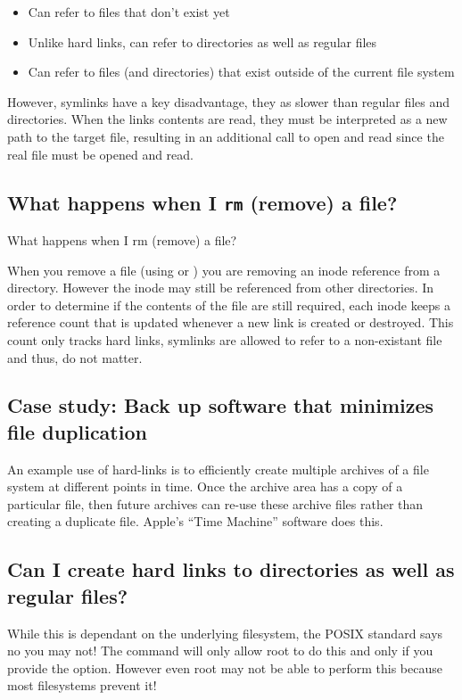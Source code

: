 \begin{itemize}
\tightlist
\item
  Can refer to files that don't exist yet
\item
  Unlike hard links, can refer to directories as well as regular files
\item
  Can refer to files (and directories) that exist outside of the current file system
\end{itemize}

However, symlinks have a key disadvantage, they as slower than regular files and directories. When the links contents are read, they must be interpreted as a new path to the target file, resulting in an additional call to open and read since the real file must be opened and read.

\subsection{What happens when I \texttt{rm} (remove) a file?}{What happens when I rm (remove) a file?}

When you remove a file (using  or ) you are removing an inode reference from a directory. However the inode may still be referenced from other directories. In order to determine if the contents of the file are still required, each inode keeps a reference count that is updated whenever a new link is created or destroyed. This count only tracks hard links, symlinks are allowed to refer to a non-existant file and thus, do not matter.

\subsection{Case study: Back up software that minimizes file duplication}

An example use of hard-links is to efficiently create multiple archives of a file system at different points in time. Once the archive area has a copy of a particular file, then future archives can re-use these archive files rather than creating a duplicate file. Apple's ``Time Machine'' software does this.

\subsection{Can I create hard links to directories as well as regular files?}

While this is dependant on the underlying filesystem, the POSIX standard says no you may not! The  command will only allow root to do this and only if you provide the  option. However even root may not be able to perform this because most filesystems prevent it!

